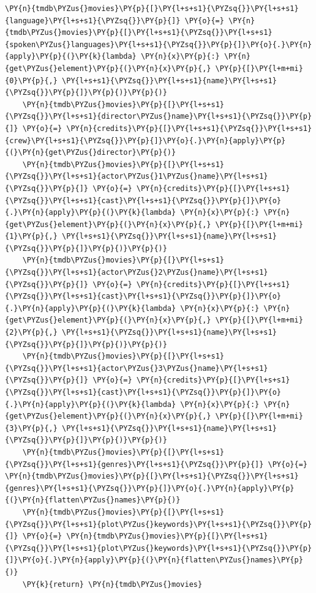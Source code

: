 \begin{tcolorbox}[breakable, size=fbox, boxrule=1pt, pad at break*=1mm,colback=cellbackground, colframe=cellborder]
\begin{Verbatim}[commandchars=\\\{\}]
    \PY{n}{tmdb\PYZus{}movies}\PY{p}{[}\PY{l+s+s1}{\PYZsq{}}\PY{l+s+s1}{language}\PY{l+s+s1}{\PYZsq{}}\PY{p}{]} \PY{o}{=} \PY{n}{tmdb\PYZus{}movies}\PY{p}{[}\PY{l+s+s1}{\PYZsq{}}\PY{l+s+s1}{spoken\PYZus{}languages}\PY{l+s+s1}{\PYZsq{}}\PY{p}{]}\PY{o}{.}\PY{n}{apply}\PY{p}{(}\PY{k}{lambda} \PY{n}{x}\PY{p}{:} \PY{n}{get\PYZus{}element}\PY{p}{(}\PY{n}{x}\PY{p}{,} \PY{p}{[}\PY{l+m+mi}{0}\PY{p}{,} \PY{l+s+s1}{\PYZsq{}}\PY{l+s+s1}{name}\PY{l+s+s1}{\PYZsq{}}\PY{p}{]}\PY{p}{)}\PY{p}{)}
    \PY{n}{tmdb\PYZus{}movies}\PY{p}{[}\PY{l+s+s1}{\PYZsq{}}\PY{l+s+s1}{director\PYZus{}name}\PY{l+s+s1}{\PYZsq{}}\PY{p}{]} \PY{o}{=} \PY{n}{credits}\PY{p}{[}\PY{l+s+s1}{\PYZsq{}}\PY{l+s+s1}{crew}\PY{l+s+s1}{\PYZsq{}}\PY{p}{]}\PY{o}{.}\PY{n}{apply}\PY{p}{(}\PY{n}{get\PYZus{}director}\PY{p}{)}
    \PY{n}{tmdb\PYZus{}movies}\PY{p}{[}\PY{l+s+s1}{\PYZsq{}}\PY{l+s+s1}{actor\PYZus{}1\PYZus{}name}\PY{l+s+s1}{\PYZsq{}}\PY{p}{]} \PY{o}{=} \PY{n}{credits}\PY{p}{[}\PY{l+s+s1}{\PYZsq{}}\PY{l+s+s1}{cast}\PY{l+s+s1}{\PYZsq{}}\PY{p}{]}\PY{o}{.}\PY{n}{apply}\PY{p}{(}\PY{k}{lambda} \PY{n}{x}\PY{p}{:} \PY{n}{get\PYZus{}element}\PY{p}{(}\PY{n}{x}\PY{p}{,} \PY{p}{[}\PY{l+m+mi}{1}\PY{p}{,} \PY{l+s+s1}{\PYZsq{}}\PY{l+s+s1}{name}\PY{l+s+s1}{\PYZsq{}}\PY{p}{]}\PY{p}{)}\PY{p}{)}
    \PY{n}{tmdb\PYZus{}movies}\PY{p}{[}\PY{l+s+s1}{\PYZsq{}}\PY{l+s+s1}{actor\PYZus{}2\PYZus{}name}\PY{l+s+s1}{\PYZsq{}}\PY{p}{]} \PY{o}{=} \PY{n}{credits}\PY{p}{[}\PY{l+s+s1}{\PYZsq{}}\PY{l+s+s1}{cast}\PY{l+s+s1}{\PYZsq{}}\PY{p}{]}\PY{o}{.}\PY{n}{apply}\PY{p}{(}\PY{k}{lambda} \PY{n}{x}\PY{p}{:} \PY{n}{get\PYZus{}element}\PY{p}{(}\PY{n}{x}\PY{p}{,} \PY{p}{[}\PY{l+m+mi}{2}\PY{p}{,} \PY{l+s+s1}{\PYZsq{}}\PY{l+s+s1}{name}\PY{l+s+s1}{\PYZsq{}}\PY{p}{]}\PY{p}{)}\PY{p}{)}
    \PY{n}{tmdb\PYZus{}movies}\PY{p}{[}\PY{l+s+s1}{\PYZsq{}}\PY{l+s+s1}{actor\PYZus{}3\PYZus{}name}\PY{l+s+s1}{\PYZsq{}}\PY{p}{]} \PY{o}{=} \PY{n}{credits}\PY{p}{[}\PY{l+s+s1}{\PYZsq{}}\PY{l+s+s1}{cast}\PY{l+s+s1}{\PYZsq{}}\PY{p}{]}\PY{o}{.}\PY{n}{apply}\PY{p}{(}\PY{k}{lambda} \PY{n}{x}\PY{p}{:} \PY{n}{get\PYZus{}element}\PY{p}{(}\PY{n}{x}\PY{p}{,} \PY{p}{[}\PY{l+m+mi}{3}\PY{p}{,} \PY{l+s+s1}{\PYZsq{}}\PY{l+s+s1}{name}\PY{l+s+s1}{\PYZsq{}}\PY{p}{]}\PY{p}{)}\PY{p}{)}
    \PY{n}{tmdb\PYZus{}movies}\PY{p}{[}\PY{l+s+s1}{\PYZsq{}}\PY{l+s+s1}{genres}\PY{l+s+s1}{\PYZsq{}}\PY{p}{]} \PY{o}{=} \PY{n}{tmdb\PYZus{}movies}\PY{p}{[}\PY{l+s+s1}{\PYZsq{}}\PY{l+s+s1}{genres}\PY{l+s+s1}{\PYZsq{}}\PY{p}{]}\PY{o}{.}\PY{n}{apply}\PY{p}{(}\PY{n}{flatten\PYZus{}names}\PY{p}{)}
    \PY{n}{tmdb\PYZus{}movies}\PY{p}{[}\PY{l+s+s1}{\PYZsq{}}\PY{l+s+s1}{plot\PYZus{}keywords}\PY{l+s+s1}{\PYZsq{}}\PY{p}{]} \PY{o}{=} \PY{n}{tmdb\PYZus{}movies}\PY{p}{[}\PY{l+s+s1}{\PYZsq{}}\PY{l+s+s1}{plot\PYZus{}keywords}\PY{l+s+s1}{\PYZsq{}}\PY{p}{]}\PY{o}{.}\PY{n}{apply}\PY{p}{(}\PY{n}{flatten\PYZus{}names}\PY{p}{)}
    \PY{k}{return} \PY{n}{tmdb\PYZus{}movies}
\end{Verbatim}
\end{tcolorbox}

